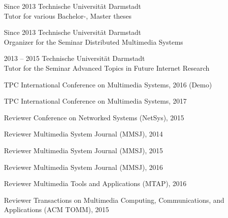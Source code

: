 \begin{cv}{}
\begin{cvlist}{}
		\end{cvlist}
		\begin{cvlist}{}\label{teach}
			\item[Since 2013] Technische Universit\"at Darmstadt \\
							Tutor for various Bachelor-, Master theses
			\item[Since 2013] Technische Universit\"at Darmstadt \\
										Organizer for the Seminar Distributed Multimedia Systems
			\item[2013 -- 2015] Technische Universit\"at Darmstadt \\
								Tutor for the Seminar Advanced Topics in Future Internet Research
		\end{cvlist}
		\begin{cvlist}{}\label{science}		
			\item[TPC] International Conference on Multimedia Systems, 2016 (Demo)
			\item[TPC] International Conference on Multimedia Systems, 2017
			\item[Reviewer] Conference on Networked Systems (NetSys), 2015
			\item[Reviewer] Multimedia System Journal (MMSJ), 2014
			\item[Reviewer] Multimedia System Journal (MMSJ), 2015
			\item[Reviewer] Multimedia System Journal (MMSJ), 2016
			\item[Reviewer] Multimedia Tools and Applications (MTAP), 2016
			\item[Reviewer] Transactions on Multimedia Computing, Communications, and Applications (ACM TOMM), 2015
		\end{cvlist}
 \end{cv}
 

